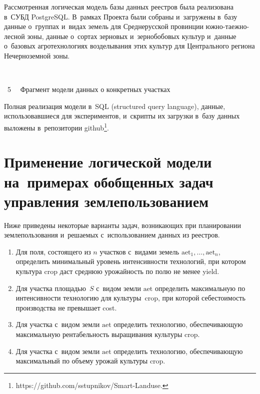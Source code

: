 \begin{multicols}{2}
    

    Рассмотренная логическая модель базы данных реестров была 
реализована в~СУБД PostgreSQL. В~рамках Проекта были собраны 
и~загружены в~базу данные о~группах и~видах земель для Среднерусской 
провинции юж\-но-та\-еж\-но-лес\-ной зоны, данные о~сор\-тах зерновых 
и~зернобобовых культур и~данные о~базовых агротехнологиях возделывания 
этих культур для Центрального региона Нечерноземной зоны.

{ \begin{center}  %
 \vspace*{7pt}
    \mbox{%
\epsfxsize=48mm
}

\vspace*{3pt}

\noindent
{{\figurename~5}\ \ \small{
Фрагмент модели данных о конкретных участках
}}
\end{center}
}



Полная 
реализация модели в~SQL (structured query language), данные, использовавшиеся для экспериментов, 
и~скрипты их загрузки в~базу данных выложены в~репозитории 
github\footnote{{\sf  https://github.com/sstupnikov/Smart-Landuse}.}.





\section{Применение логической модели на~примерах обобщенных 
задач управления землепользованием}

    Ниже приведены некоторые варианты задач, возникающих при 
планировании землепользования и~решаемых с~использованием данных из 
реестров.
    \begin{enumerate}[1.]
\item Для поля, состоящего из $n$ участков с~видами земель $\mathrm{aet}_1, \ldots , 
\mathrm{aet}_n$,  определить минимальный уровень интенсивности технологий, 
при котором культура crop даст среднюю уро\-жай\-ность по полю не менее 
yield.
\item Для участка площадью~$S$ с~видом земли $\mathrm{aet}$ определить 
максимальную по ин\-тен\-сив\-ности технологию для культуры~crop, при 
которой се\-бе\-сто\-и\-мость производства не превышает cost.
\item Для участка с~видом земли $\mathrm{aet}$ определить технологию, 
обеспечивающую максимальную рен\-та\-бель\-ность выращивания культуры 
crop.
\item Для участка с~видом земли $\mathrm{aet}$ определить технологию, 
обес\-пе\-чи\-ва\-ющую максимальный по объему урожай культуры crop.
\end{enumerate}
    

\end{multicols}
